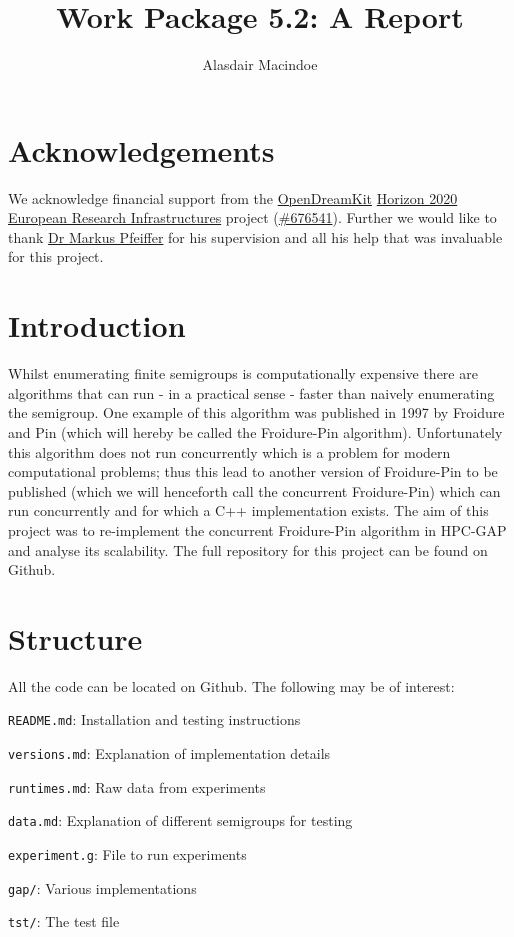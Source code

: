 \documentclass{report}
\author{Alasdair Macindoe}
\date{}
\title{Work Package 5.2: A Report}
\begin{document}
\maketitle

\section*{Acknowledgements}
We acknowledge financial support from the \href{http://opendreamkit.org/}{OpenDreamKit} \href{https://ec.europa.eu/programmes/horizon2020/}{Horizon 2020}
\href{https://ec.europa.eu/programmes/horizon2020/en/h2020-section/european-research-infrastructures-including-e-infrastructures}{European Research Infrastructures}
project (\href{http://cordis.europa.eu/project/rcn/198334_en.html}{\#676541}).
Further we would like to thank \href{https://www.cs.st-andrews.ac.uk/directory/person?id=mp397}{Dr Markus Pfeiffer} for his supervision and all his help
that was invaluable for this project.

\section*{Introduction}
Whilst enumerating finite semigroups is computationally expensive there are algorithms that can run - in a practical sense - faster than naively enumerating
the semigroup. One example of this algorithm was published in 1997 by Froidure and Pin\cite{fpin} (which will hereby be called the Froidure-Pin algorithm).
Unfortunately this algorithm does not run concurrently which is a problem for modern computational problems; thus this lead to another version of Froidure-Pin to be
published\cite{cfp} (which we will henceforth call the concurrent Froidure-Pin) which can run concurrently and for which a C++ implementation exists\cite{cfpcpp}.
\newline
\newline
The aim of this project was to re-implement the concurrent Froidure-Pin algorithm in HPC-GAP\cite{GAP4} and analyse its scalability.
The full repository for this project can be found on Github\cite{project}.

\section*{Structure}
All the code can be located on Github\cite{project}. The following may be of interest:
\newline
\begin{description}
\item \texttt{README.md}: Installation and testing instructions
\item \texttt{versions.md}: Explanation of implementation details
\item \texttt{runtimes.md}: Raw data from experiments
\item \texttt{data.md}: Explanation of different semigroups for testing
\item \texttt{experiment.g}: File to run experiments
\item \texttt{gap/}: Various implementations
\item \texttt{tst/}: The test file
\end{description}
\end{document}

